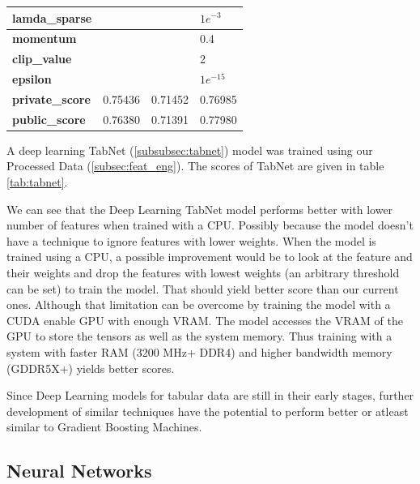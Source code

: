 \documentclass[sigconf, nonacm]{acmart}
\begin{document}
\begin{table}[h]
\begin{tabular}{@{}|l|l|l|l|@{}}
		\textbf{lamda\_sparse}        &            &            & $1e^{-3}$  \\ \midrule
		\textbf{momentum}             &            &            & 0.4        \\ \midrule
		\textbf{clip\_value}          &            &            & 2          \\ \midrule
		\textbf{epsilon}              &            &            & $1e^{-15}$ \\ \midrule
		\textbf{private\_score}       & 0.75436    & 0.71452    & 0.76985    \\ \midrule
		\textbf{public\_score}        & 0.76380    & 0.71391    & 0.77980    \\  \bottomrule
	\end{tabular}
\end{table}

A deep learning TabNet (\ref{subsubsec:tabnet}) model was trained using our Processed Data (\ref{subsec:feat_eng}). The scores of TabNet are given in table \ref{tab:tabnet}.

We can see that the Deep Learning TabNet model performs better with lower number of features when trained with a CPU. Possibly because the model doesn't have a technique to ignore features with lower weights. When the model is trained using a CPU, a possible improvement would be to look at the feature and their weights and drop the features with lowest weights (an arbitrary threshold can be set) to train the model. That should yield better score than our current ones. Although that limitation can be overcome by training the model with a CUDA enable GPU with enough VRAM. The model accesses the VRAM of the GPU to store the tensors as well as the system memory. Thus training with a system with faster RAM (3200 MHz+ DDR4) and higher bandwidth memory (GDDR5X+) yields better scores. 

Since Deep Learning models for tabular data are still in their early stages, further development of similar techniques have the potential to perform better or atleast similar to Gradient Boosting Machines.

\subsection{Neural Networks}
\end{document}
